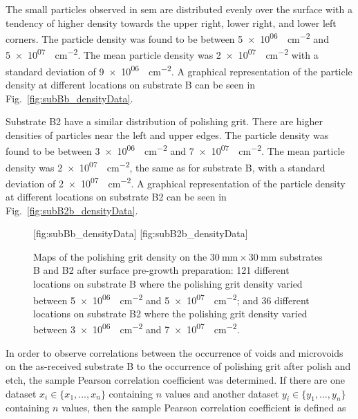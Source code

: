 The small particles observed in \ac{sem} are distributed evenly over the surface with a tendency of higher density towards the upper right, lower right, and lower left corners. The particle density was found to be between \SI{5e+06}{\particle\centi\metre^{-2}} and \SI{5e+07}{\particle\centi\metre^{-2}}. The mean particle density was \SI{2e+07}{\particle\centi\metre^{-2}} with a standard deviation of \SI{9e+06}{\particle\centi\metre^{-2}}. A graphical representation of the particle density at different locations on substrate B can be seen in Fig.~\ref{fig:subBb_densityData}.

Substrate B2 have a similar distribution of polishing grit. There are higher densities of particles near the left and upper edges. The particle density was found to be between \SI{3e+06}{\particle\centi\metre^{-2}} and \SI{7e+07}{\particle\centi\metre^{-2}}. The mean particle density was \SI{2e+07}{\particle\centi\metre^{-2}}, the same as for substrate B, with a standard deviation of \SI{2e+07}{\particle\centi\metre^{-2}}. A graphical representation of the particle density at different locations on substrate B2 can be seen in Fig.~\ref{fig:subB2b_densityData}.

\begin{figure}[htbp]
    \centering
    [fig:subBb_densityData]
    \hfill
    [fig:subB2b_densityData]
    \caption[Maps of the polishing grit density on substrates B and B2 after surface pre-growth preparation.]{Maps of the polishing grit density on the $\SI{30}{\milli\metre}\times\SI{30}{\milli\metre}$ substrates B and B2 after surface pre-growth preparation:  121 different locations on substrate B where the polishing grit density varied between \SI{5e+06}{\particle\centi\metre^{-2}} and \SI{5e+07}{\particle\centi\metre^{-2}}; and  36 different locations on substrate B2 where the polishing grit density varied between \SI{3e+06}{\particle\centi\metre^{-2}} and \SI{7e+07}{\particle\centi\metre^{-2}}.}
    \label{fig:subBb_and_subB2b_densityData}
\end{figure}

In order to observe correlations between the occurrence of voids and microvoids on the as-received substrate B to the occurrence of polishing grit after polish and etch, the sample Pearson correlation coefficient was determined.  If there are one dataset $x_i \in \{x_1, ..., x_n\}$ containing $n$ values and another dataset $y_i \in \{y_1, ..., y_n\}$ containing $n$ values, then the sample Pearson correlation coefficient is defined as


